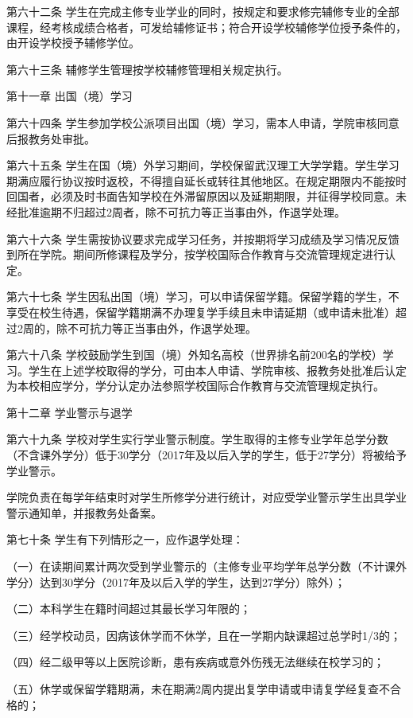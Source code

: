 \documentclass[UTF8,12pt,a4paper]{report}
\begin{document}
第六十二条  学生在完成主修专业学业的同时，按规定和要求修完辅修专业的全部课程，经考核成绩合格者，可发给辅修证书；符合开设学校辅修学位授予条件的，由开设学校授予辅修学位。

第六十三条  辅修学生管理按学校辅修管理相关规定执行。



第十一章  出国（境）学习

第六十四条  学生参加学校公派项目出国（境）学习，需本人申请，学院审核同意后报教务处审批。

第六十五条  学生在国（境）外学习期间，学校保留武汉理工大学学籍。学生学习期满应履行协议按时返校，不得擅自延长或转往其他地区。在规定期限内不能按时回国者，必须及时书面告知学校在外滞留原因以及延期期限，并征得学校同意。未经批准逾期不归超过2周者，除不可抗力等正当事由外，作退学处理。

第六十六条  学生需按协议要求完成学习任务，并按期将学习成绩及学习情况反馈到所在学院。期间所修课程及学分，按学校国际合作教育与交流管理规定进行认定。

第六十七条  学生因私出国（境）学习，可以申请保留学籍。保留学籍的学生，不享受在校生待遇，保留学籍期满不办理复学手续且未申请延期（或申请未批准）超过2周的，除不可抗力等正当事由外，作退学处理。

第六十八条  学校鼓励学生到国（境）外知名高校（世界排名前200名的学校）学习。学生在上述学校取得的学分，可由本人申请、学院审核、报教务处批准后认定为本校相应学分，学分认定办法参照学校国际合作教育与交流管理规定执行。



第十二章  学业警示与退学

第六十九条  学校对学生实行学业警示制度。学生取得的主修专业学年总学分数（不含课外学分）低于30学分（2017年及以后入学的学生，低于27学分）将被给予学业警示。

学院负责在每学年结束时对学生所修学分进行统计，对应受学业警示学生出具学业警示通知单，并报教务处备案。

第七十条  学生有下列情形之一，应作退学处理：

（一）在读期间累计两次受到学业警示的（主修专业平均学年总学分数（不计课外学分）达到30学分（2017年及以后入学的学生，达到27学分）除外）；   

（二）本科学生在籍时间超过其最长学习年限的；

（三）经学校动员，因病该休学而不休学，且在一学期内缺课超过总学时1/3的；

（四）经二级甲等以上医院诊断，患有疾病或意外伤残无法继续在校学习的；

（五）休学或保留学籍期满，未在期满2周内提出复学申请或申请复学经复查不合格的；
\end{document}

